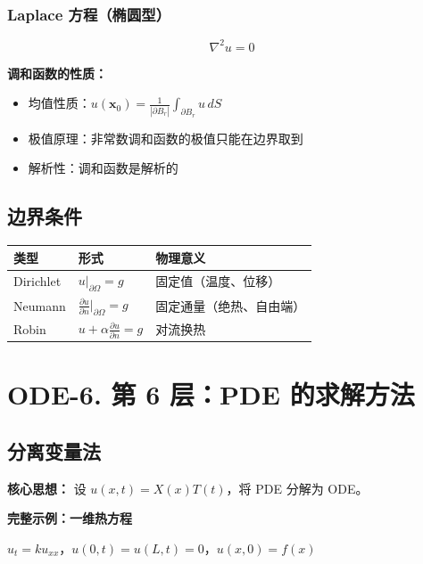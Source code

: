 \subsubsection{Laplace 方程（椭圆型）}

\[
\nabla^2 u = 0
\]

\textbf{调和函数的性质：}
\begin{itemize}
  \item 均值性质：$u(\mathbf{x}_0) = \frac{1}{|\partial B_r|}\int_{\partial B_r} u\,dS$
  \item 极值原理：非常数调和函数的极值只能在边界取到
  \item 解析性：调和函数是解析的
\end{itemize}

\subsection{边界条件}

\begin{center}
\begin{tabular}{L{2.5cm}L{4cm}L{5cm}}
\toprule
\textbf{类型} & \textbf{形式} & \textbf{物理意义} \\
\midrule
Dirichlet & $u|_{\partial\Omega} = g$ & 固定值（温度、位移） \\
Neumann & $\frac{\partial u}{\partial n}\big|_{\partial\Omega} = g$ & 固定通量（绝热、自由端） \\
Robin & $u + \alpha\frac{\partial u}{\partial n} = g$ & 对流换热 \\
\bottomrule
\end{tabular}
\end{center}

\section{ODE-6. 第 6 层：PDE 的求解方法}

\subsection{分离变量法}

\textbf{核心思想：} 设 $u(x,t) = X(x)T(t)$，将 PDE 分解为 ODE。

\textbf{完整示例：一维热方程}

$u_t = ku_{xx}$，$u(0,t) = u(L,t) = 0$，$u(x,0) = f(x)$

